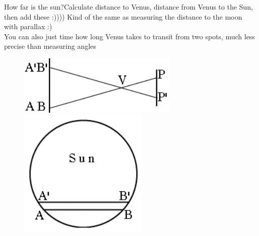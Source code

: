 \documentclass[12pt]{beamer}
\begin{document}
        \begin{frame}{How far is the sun?}{Calculate distance to Venus, distance from Venus to the Sun, then add these :))))}
            Kind of the same as measuring the distance to the moon with parallax :)\\
            You can also just time how long Venus takes to transit from two spots, much less precise than measuring angles
            \begin{figure}
                \includegraphics[scale=0.6]{halley2.png}
                \includegraphics[scale=0.6]{halley1.png}
            \end{figure}
        \end{frame}
\end{document}
